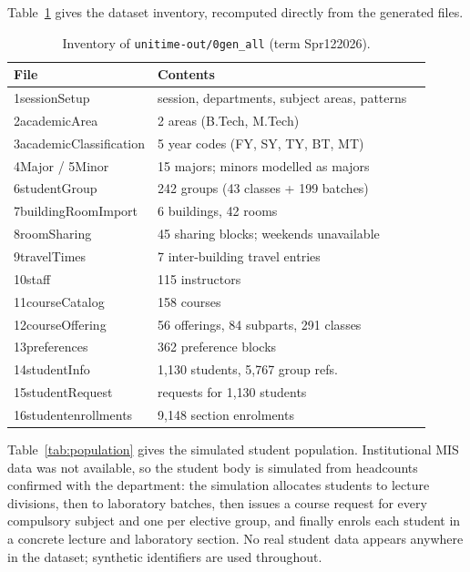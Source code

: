 \documentclass[journal]{IEEEtran}
\begin{document}
Table~\ref{tab:inventory} gives the dataset inventory, recomputed directly from the generated files.

\begin{table}[t]
\centering
\caption{Inventory of \texttt{unitime-out/0gen\_all} (term Spr122026).}
\label{tab:inventory}
\footnotesize
\begin{tabular}{@{}lll@{}}
\toprule
File & Contents \\
\midrule
1sessionSetup & session, departments, subject areas, patterns \\
2academicArea & 2 areas (B.Tech, M.Tech) \\
3academicClassification & 5 year codes (FY, SY, TY, BT, MT) \\
4Major / 5Minor & 15 majors; minors modelled as majors \\
6studentGroup & 242 groups (43 classes + 199 batches) \\
7buildingRoomImport & 6 buildings, 42 rooms \\
8roomSharing & 45 sharing blocks; weekends unavailable \\
9travelTimes & 7 inter-building travel entries \\
10staff & 115 instructors \\
11courseCatalog & 158 courses \\
12courseOffering & 56 offerings, 84 subparts, 291 classes \\
13preferences & 362 preference blocks \\
14studentInfo & 1{,}130 students, 5{,}767 group refs. \\
15studentRequest & requests for 1{,}130 students \\
16studentenrollments & 9{,}148 section enrolments \\
\bottomrule
\end{tabular}
\end{table}

Table~\ref{tab:population} gives the simulated student population. Institutional MIS data was not available, so the student body is simulated from headcounts confirmed with the department: the simulation allocates students to lecture divisions, then to laboratory batches, then issues a course request for every compulsory subject and one per elective group, and finally enrols each student in a concrete lecture and laboratory section. No real student data appears anywhere in the dataset; synthetic identifiers are used throughout.
\end{document}

